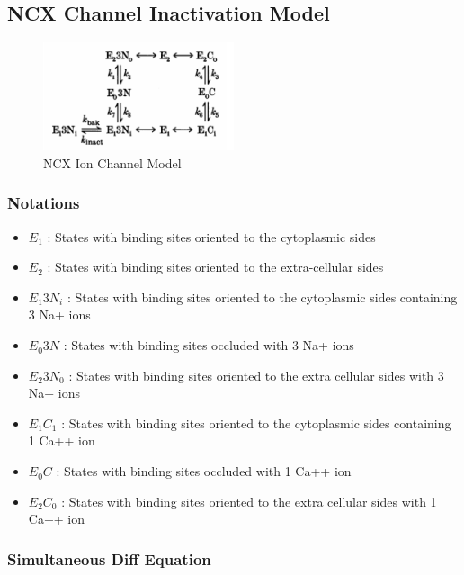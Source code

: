 
\subsection{NCX Channel Inactivation Model}


\begin{figure}[h!]
 \centering
  \includegraphics[width=0.5\textwidth]{pic/ncx.png}
 \caption{NCX Ion Channel Model}
 \end{figure}



\subsubsection{Notations}
\begin{itemize}
\item $E_1$ : States with binding sites oriented to the cytoplasmic sides
\item $E_2$ : States with binding sites oriented to the extra-cellular sides
\item $E_{1}3N_{i}$ : States with binding sites oriented to the cytoplasmic sides containing 3 Na+ ions
\item $E_{0}3N$ : States with binding sites occluded with 3 Na+ ions 
\item $E_{2}3N_{0}$ : States with binding sites oriented to the extra cellular sides with 3 Na+ ions
\item $E_{1}C_{1}$ : States with binding sites oriented to the cytoplasmic sides containing 1 Ca++ ion
\item $E_{0}C$ : States with binding sites occluded with 1 Ca++ ion
\item $E_{2}C_{0}$ : States with binding sites oriented to the extra cellular sides with 1 Ca++ ion
\end{itemize}

\newpage

\subsubsection{Simultaneous Diff Equation}



